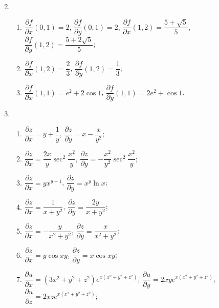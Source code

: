 \begin{enumerate}
\[        \]
    \item %
        \begin{enumerate}[(1)]
            \item %
                $\dfrac{\partial{f}}{\partial{x}}(0,1) = 2$,
                $\dfrac{\partial{f}}{\partial{y}}(0,1) = 2$,
                $\dfrac{\partial{f}}{\partial{x}}(1,2) = \dfrac{5 + \sqrt{5}}{5}$,
                $\dfrac{\partial{f}}{\partial{y}}(1,2) = \dfrac{5 + 2\sqrt{5}}{5}$;
            \item %
                $\dfrac{\partial{f}}{\partial{x}}(1,2) = \dfrac23$,
                $\dfrac{\partial{f}}{\partial{y}}(1,2) = \dfrac13$;
            \item %
                $\dfrac{\partial{f}}{\partial{x}}(1,1) = e^2 + 2\cos{1}$,
                $\dfrac{\partial{f}}{\partial{y}}(1,1) = 2e^2 + \cos{1}$.
        \end{enumerate}
    \item %
        \begin{enumerate}[(1)]
            \item %
                $\dfrac{\partial{z}}{\partial{x}} = y + \dfrac1y$,
                $\dfrac{\partial{z}}{\partial{y}} = x - \dfrac{x}{y^2}$;
            \item %
                $\dfrac{\partial{z}}{\partial{x}} = \dfrac{2x}{y}\sec^2\dfrac{x^2}{y}$,
                $\dfrac{\partial{z}}{\partial{y}} = -\dfrac{x^2}{y^2}\sec^2\dfrac{x^2}{y}$;
            \item %
                $\dfrac{\partial{z}}{\partial{x}} = yx^{y-1}$,
                $\dfrac{\partial{z}}{\partial{y}} = x^y\ln{x}$;
            \item %
                $\dfrac{\partial{z}}{\partial{x}} = \dfrac{1}{x + y^2}$,
                $\dfrac{\partial{z}}{\partial{y}} = \dfrac{2y}{x + y^2}$;
            \item %
                $\dfrac{\partial{z}}{\partial{x}} = -\dfrac{y}{x^2 + y^2}$,
                $\dfrac{\partial{z}}{\partial{y}} = \dfrac{x}{x^2 + y^2}$;
            \item %
                $\dfrac{\partial{z}}{\partial{x}} = y\cos{xy}$,
                $\dfrac{\partial{z}}{\partial{y}} = x\cos{xy}$;
            \item %
                $\dfrac{\partial{u}}{\partial{x}} = (3x^2+y^2+z^2)e^{x(x^2+y^2+z^2)}$,
                $\dfrac{\partial{u}}{\partial{y}} = 2xye^{x(x^2+y^2+z^2)}$,
                $\dfrac{\partial{u}}{\partial{z}} = 2xze^{x(x^2+y^2+z^2)}$;

\end{enumerate}
\end{enumerate}
